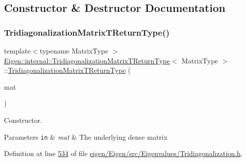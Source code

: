 \subsection{Constructor \& Destructor Documentation}
\mbox{\label{struct_eigen_1_1internal_1_1_tridiagonalization_matrix_t_return_type_ac49f3c4df8b40dfa002c6e04e3d1b97f}} 
\subsubsection{\texorpdfstring{Tridiagonalization\+Matrix\+T\+Return\+Type()}{TridiagonalizationMatrixTReturnType()}\hspace{0.1cm}{\footnotesize\ttfamily [1/2]}}
{\footnotesize\ttfamily template$<$typename Matrix\+Type $>$ \\
\hyperlink{struct_eigen_1_1internal_1_1_tridiagonalization_matrix_t_return_type}{Eigen\+::internal\+::\+Tridiagonalization\+Matrix\+T\+Return\+Type}$<$ Matrix\+Type $>$\+::\hyperlink{struct_eigen_1_1internal_1_1_tridiagonalization_matrix_t_return_type}{Tridiagonalization\+Matrix\+T\+Return\+Type} (\begin{DoxyParamCaption}\item[{const Matrix\+Type \&}]{mat }\end{DoxyParamCaption})\hspace{0.3cm}{\ttfamily [inline]}}



Constructor. 


\begin{DoxyParams}[1]{Parameters}
\mbox{\tt in}  & {\em mat} & The underlying dense matrix \\
\hline
\end{DoxyParams}


Definition at line \hyperlink{eigen_2_eigen_2src_2_eigenvalues_2_tridiagonalization_8h_source_l00534}{534} of file \hyperlink{eigen_2_eigen_2src_2_eigenvalues_2_tridiagonalization_8h_source}{eigen/\+Eigen/src/\+Eigenvalues/\+Tridiagonalization.\+h}.


